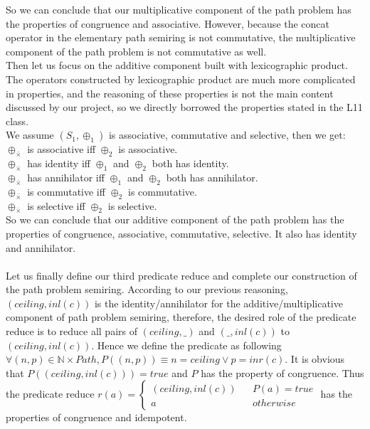 \documentclass[a4paper,10pt]{article}
\begin{document}
So we can conclude that our multiplicative component of the path problem has the properties of congruence and associative. However, because the concat operator in the elementary path semiring is not commutative, the multiplicative component of the path problem is not commutative as well.\\
Then let us focus on the additive component built with lexicographic product. 
The operators constructed by lexicographic product are much more complicated in properties, and the reasoning of these properties is not the main content discussed by our project, so we directly borrowed the properties stated in the L11 class.\\
We assume $(S_1,\oplus_1)$ is associative, commutative and selective, then we get:\\
$\oplus_{\bar{\times}}$ is associative iff $\oplus_2$ is associative.\\
$\oplus_{\bar{\times}}$ has identity iff $\oplus_1$ and $\oplus_2$ both has identity.\\
$\oplus_{\bar{\times}}$ has annihilator iff $\oplus_1$ and $\oplus_2$ both has annihilator.\\
$\oplus_{\bar{\times}}$ is commutative iff $\oplus_2$ is commutative.\\
$\oplus_{\bar{\times}}$ is selective iff $\oplus_2$ is selective.\\
So we can conclude that our additive component of the path problem has the properties of congruence, associative, commutative, selective. It also has identity and annihilator.\\\\
Let us finally define our third predicate reduce and complete our construction of the path problem semiring. According to our previous reasoning, $(ceiling,inl (c))$ is the identity/annihilator for the additive/multiplicative component of path problem semiring, therefore, the desired role of the predicate reduce is to reduce all pairs of $(ceiling,\_)$ and $(\_,inl(c))$ to $(ceiling,inl(c))$.
Hence we define the predicate as following $\forall (n,p) \in \mathbb{N}\times Path, P((n,p)) \equiv n = ceiling \vee p = inr(c)$. It is obvious that $P((ceiling,inl (c))) = true$ and $P$ has the property of congruence. Thus the predicate reduce $r(a) = \left\{
\begin{aligned}
(ceiling,inl (c)) &  & P(a) = true \\
a &  & otherwise 
\end{aligned}
\right.$ has the properties of congruence and idempotent.\\
\end{document}
